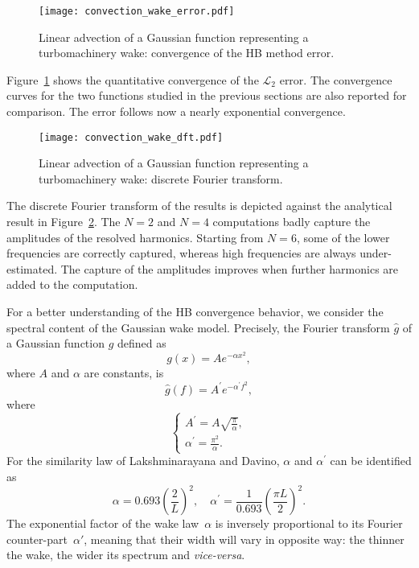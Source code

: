 \begin{figure}[htp]
  \centering
  \texttt{[image: convection\_wake\_error.pdf]}
  \caption{Linear advection of a Gaussian function representing a 
  turbomachinery wake: convergence of the HB method error.}
  \label{fig:conv_wake}
\end{figure}
Figure~\ref{fig:conv_wake} shows the quantitative convergence of 
the $\mathcal{L}_2$ error. The
convergence curves for the two functions studied in the previous sections
are also reported for comparison.
The error follows now a nearly exponential convergence.
\begin{figure}[htp]
  \centering
  \texttt{[image: convection\_wake\_dft.pdf]}
  \caption{Linear advection of a Gaussian function representing a turbomachinery wake: 
  discrete Fourier transform.}
  \label{fig:dft_wake}
\end{figure}
The discrete Fourier transform of the results is
depicted against the analytical result in Figure~\ref{fig:dft_wake}.
The $N=2$ and $N=4$ computations badly capture the amplitudes of the
resolved harmonics.
Starting from $N=6$, some of the lower 
frequencies are correctly captured, whereas high frequencies are
always under-estimated.
The capture of the amplitudes 
improves when further harmonics are added to the computation.

For a better understanding of the HB convergence behavior, 
we consider the spectral content of the Gaussian wake model. 
Precisely, the Fourier transform $\widehat{g}$ of a Gaussian function $g$
defined as
\begin{equation}
    g(x) = A e^{-\alpha x^2},
    \label{eq:simple_gaussian_function}
\end{equation}
where $A$ and $\alpha$ are constants, is
\begin{equation}
    \widehat{g}(f) = A^\prime e^{-\alpha^\prime f^2},
    \label{eq:fourier_transform_gaussian}
\end{equation}
where
\begin{equation}
  \begin{cases}
    A^\prime=A \sqrt{\frac{\pi}{\alpha}},\\
    \alpha^\prime = \frac{\pi^2}{\alpha}.
  \end{cases}
\end{equation}
For the similarity law of Lakshminarayana and Davino, 
$\alpha$ and $\alpha^\prime$ can be identified as
\begin{equation}
    \alpha =  0.693 \left( \frac{2}{L} \right)^2, \quad
    \alpha^\prime =  \frac{1}{0.693} \left( \frac{\pi L}{2} \right)^2.
    \label{eq:gaussian_params_laksh}
\end{equation}
The exponential factor of the wake law~$\alpha$ is inversely
proportional to its Fourier counter-part~$\alpha'$, meaning that their
width will vary in opposite way: the thinner the wake, the wider its
spectrum and \emph{vice-versa}.

